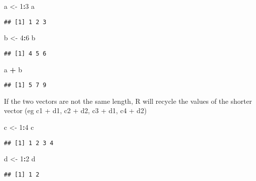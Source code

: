 \documentclass[]{article}
\newenvironment{Shaded}{\begin{snugshade}}{\end{snugshade}}
\newcommand{\DecValTok}[1]{\textcolor[rgb]{0.00,0.00,0.81}{#1}}
\newcommand{\StringTok}[1]{\textcolor[rgb]{0.31,0.60,0.02}{#1}}
\newcommand{\OperatorTok}[1]{\textcolor[rgb]{0.81,0.36,0.00}{\textbf{#1}}}
\newcommand{\NormalTok}[1]{#1}
\begin{document}
\begin{Shaded}
\begin{Highlighting}[]
\NormalTok{a <-}\StringTok{ }\DecValTok{1}\OperatorTok{:}\DecValTok{3}
\NormalTok{a}
\end{Highlighting}
\end{Shaded}

\begin{verbatim}
## [1] 1 2 3
\end{verbatim}

\begin{Shaded}
\begin{Highlighting}[]
\NormalTok{b <-}\StringTok{ }\DecValTok{4}\OperatorTok{:}\DecValTok{6}
\NormalTok{b}
\end{Highlighting}
\end{Shaded}

\begin{verbatim}
## [1] 4 5 6
\end{verbatim}

\begin{Shaded}
\begin{Highlighting}[]
\NormalTok{a }\OperatorTok{+}\StringTok{ }\NormalTok{b}
\end{Highlighting}
\end{Shaded}

\begin{verbatim}
## [1] 5 7 9
\end{verbatim}

If the two vectors are not the same length, R will recycle the values of
the shorter vector (eg c1 + d1, c2 + d2, c3 + d1, c4 + d2)

\begin{Shaded}
\begin{Highlighting}[]
\NormalTok{c <-}\StringTok{ }\DecValTok{1}\OperatorTok{:}\DecValTok{4}
\NormalTok{c}
\end{Highlighting}
\end{Shaded}

\begin{verbatim}
## [1] 1 2 3 4
\end{verbatim}

\begin{Shaded}
\begin{Highlighting}[]
\NormalTok{d <-}\StringTok{ }\DecValTok{1}\OperatorTok{:}\DecValTok{2}
\NormalTok{d}
\end{Highlighting}
\end{Shaded}

\begin{verbatim}
## [1] 1 2
\end{verbatim}
\end{document}
